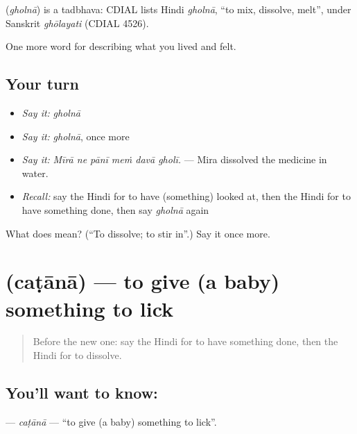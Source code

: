 \begin{cousinweb}
\textbf{} (\emph{gholnā}) is a tadbhava: CDIAL lists Hindi \emph{gholnā}, \textquotedblleft{}to mix, dissolve, melt\textquotedblright{}, under Sanskrit \emph{ghōlayati} (CDIAL 4526).
\end{cousinweb}

\begin{grammarlens}[title={What you've built}]
One more word for describing what you lived and felt.
\end{grammarlens}

\subsection*{Your turn}
\begin{itemize}
\raggedright
  \item \emph{Say it:} \emph{gholnā}
  \item \emph{Say it:} \emph{gholnā}, once more
  \item \emph{Say it:} \emph{Mīrā ne pānī meṁ davā gholī.} — Mira dissolved the medicine in water.
  \item \emph{Recall:} say the Hindi for to have (something) looked at, then the Hindi for to have something done, then say \emph{gholnā} again
\end{itemize}

\begin{tcolorbox}[breakable,colback=teal!4,colframe=teal!35!black,title={Before you move on}]
What does  mean? (\textquotedblleft{}To dissolve; to stir in\textquotedblright{}.) Say it once more.
\end{tcolorbox}
\section[\texorpdfstring{\hi{चटाना} (caṭānā)}{चटाना (caṭānā)}]{ (caṭānā) — to give (a baby) something to lick}

\label{lesson:HI-C489-catana}



\begin{quote}
Before the new one: say the Hindi for to have something done, then the Hindi for to dissolve.
\end{quote}

\subsection*{You'll want to know: }
\textbf{} — \emph{caṭānā} — \textquotedblleft{}to give (a baby) something to lick\textquotedblright{}.

